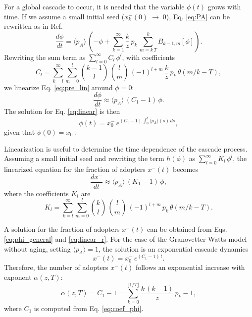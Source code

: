 For a global cascade to occur, it is needed that the variable $\phi(t)$ grows with time. If we assume a small initial seed ($x^{-}_{k} (0) \; \to \; 0$), Eq. \eqref{eq:PA} can be rewritten as in Ref. \cite{gleeson-2007}
\begin{equation} %
    \label{eq:pre_lin}
    \frac{d \phi}{dt}  = \langle p_A \rangle \, \left( -\phi + \sum_{k=1}^{\infty} \frac{k}{z} \, p_k \, \sum_{m = k\, T}^{k} B_{k-1,m} [\phi] \right).
\end{equation}
Rewriting the sum term as $\sum_{l=0}^{\infty} C_l \, \phi^l$, with coefficients 
\begin{equation}
    \label{eq:coef_phi}
    C_l = \sum_{k=l}^{\infty} \sum_{m=0}^{l} { k-1 \choose l} \, {l \choose m} \, (-1)^{l+m} \, \frac{k}{z} \, p_k \, \theta\left(m/k - T \right),
\end{equation}
we linearize Eq. \eqref{eq:pre_lin} around $\phi = 0$:
\begin{equation}
    \label{eq:linear}
    \frac{d \phi}{dt} \approx  \langle p_A \rangle \, ( C_1 -1) \, \phi.
\end{equation}
The solution for Eq. \eqref{eq:linear} is then
\begin{equation}
    \label{eq:phi_general}
    \phi(t) = x^{-}_{0}\,  e^{(C_1 - 1) \, \int_0^t \langle p_A \rangle (s) \, ds},
\end{equation}
given that $ \phi(0) = x^{-}_{0}$.

Linearization is useful to determine the time dependence of the cascade process.  Assuming a small initial seed and rewriting the term $h(\phi)$ as  $ \sum_{l=0}^{\infty} K_l\,  \phi^l $, the linearized equation for the fraction of adopters $x^{-}(t)$ becomes
\begin{equation}
    \label{eq:linear_r}
    \frac{d x^{-}}{dt} \approx  \langle p_A \rangle\,  ( K_1 -1)\, \phi,
\end{equation}
where the coefficients $K_l$ are
\begin{equation}
    \label{eq:coef_rho}
    K_l = \sum_{k=l}^{\infty} \sum_{m=0}^{l} { k \choose l} \, {l \choose m} \, (-1)^{l+m}\,  p_k \, \theta\left( m/k - T \right).
\end{equation}

A solution for the fraction of adopters $x^{-}(t)$ can be obtained from  Eqs. \eqref{eq:phi_general} and \eqref{eq:linear_r}.  For the case of the Granovetter-Watts model without aging, setting $\langle p_A \rangle = 1$,  the solution is an exponential cascade dynamics
\begin{equation}
    x^{-}(t) = x^{-}_{0} \, e^{(C_1 - 1)\, t}.
\end{equation}
Therefore, the number of adopters $x^{-} (t)$ follows an exponential increase with exponent $\alpha(z,T)$:
\begin{equation}
    \label{eq:alpha}
    \alpha(z,T) = C_1 - 1 = \sum_{k=0}^{\lfloor 1/T \rfloor} \frac{k \, (k - 1)}{z}\, p_k - 1,
\end{equation}
where $C_1$ is computed from Eq. \eqref{eq:coef_phi}. 


